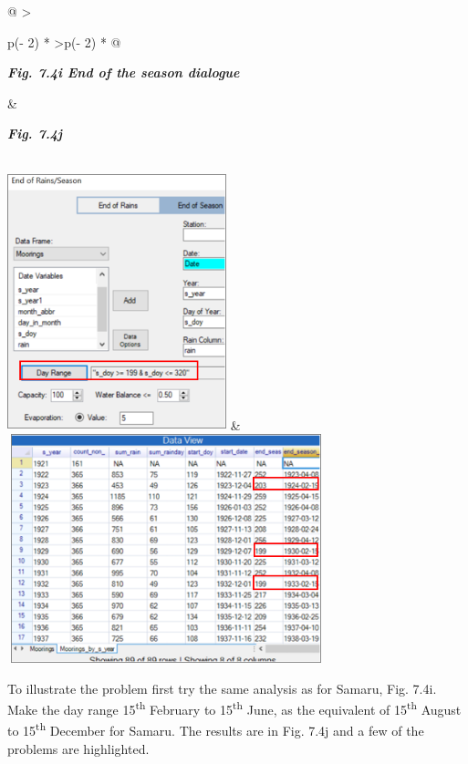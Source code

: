 \documentclass[
  letterpaper,
  DIV=11,
  numbers=noendperiod]{scrreprt}
\begin{document}
\begin{longtable}[]{@{}
  >{\raggedright\arraybackslash}p{(\columnwidth - 2\tabcolsep) * }
  >{\centering\arraybackslash}p{(\columnwidth - 2\tabcolsep) * }@{}}
\toprule\noalign{}
\begin{minipage}[b]{\linewidth}\raggedright
\textbf{\emph{Fig. 7.4i End of the season dialogue}}
\end{minipage} & \begin{minipage}[b]{\linewidth}\centering
\textbf{\emph{Fig. 7.4j}}
\end{minipage} \\
\midrule\noalign{}
\endhead
\bottomrule\noalign{}
\endlastfoot
\includegraphics[width=2.50046in,height=2.92216in]{figures/Fig7.4i.png}
&
\includegraphics[width=3.62759in,height=2.61828in]{figures/Fig7.4j.png} \\
\end{longtable}

To illustrate the problem first try the same analysis as for Samaru,
Fig. 7.4i. Make the day range 15\textsuperscript{th} February to
15\textsuperscript{th} June, as the equivalent of 15\textsuperscript{th}
August to 15\textsuperscript{th} December for Samaru. The results are in
Fig. 7.4j and a few of the problems are highlighted.
\end{document}
